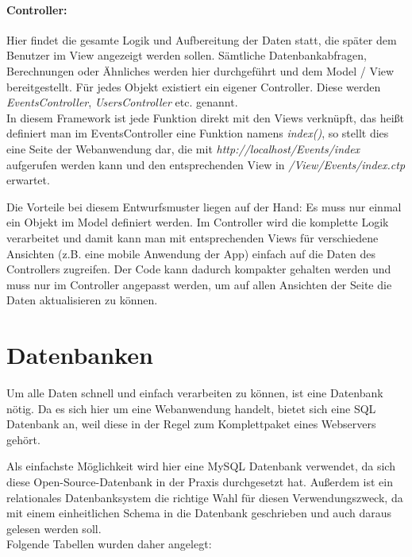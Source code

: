 \paragraph{Controller:}
Hier findet die gesamte Logik und Aufbereitung der Daten statt, die später dem Benutzer im View angezeigt werden sollen. Sämtliche Datenbankabfragen, Berechnungen oder Ähnliches werden hier durchgeführt und dem Model / View bereitgestellt. Für jedes Objekt existiert ein eigener Controller. Diese werden \emph{EventsController}, \emph{UsersController} etc. genannt.\\
In diesem Framework ist jede Funktion direkt mit den Views verknüpft, das heißt definiert man im EventsController eine Funktion namens \emph{index()}, so stellt dies eine Seite der Webanwendung dar, die mit \emph{http://localhost/Events/index} aufgerufen werden kann und den entsprechenden View in \emph{/View/Events/index.ctp} erwartet.\par

Die Vorteile bei diesem Entwurfsmuster liegen auf der Hand: Es muss nur einmal ein Objekt im Model definiert werden. Im Controller wird die komplette Logik verarbeitet und damit kann man mit entsprechenden Views für verschiedene Ansichten (z.B. eine mobile Anwendung der App) einfach auf die Daten des Controllers zugreifen. Der Code kann dadurch kompakter gehalten werden und muss nur im Controller angepasst werden, um auf allen Ansichten der Seite die Daten aktualisieren zu können.


\section{Datenbanken}
Um alle Daten schnell und einfach verarbeiten zu können, ist eine Datenbank nötig. Da es sich hier um eine Webanwendung handelt, bietet sich eine SQL Datenbank an, weil diese in der Regel zum Komplettpaket eines Webservers gehört.\par

Als einfachste Möglichkeit wird hier eine MySQL Datenbank verwendet, da sich diese Open-Source-Datenbank in der Praxis durchgesetzt hat. Außerdem ist ein relationales Datenbanksystem die richtige Wahl für diesen Verwendungszweck, da mit einem einheitlichen Schema in die Datenbank geschrieben und auch daraus gelesen werden soll.\\
Folgende Tabellen wurden daher angelegt:\par

